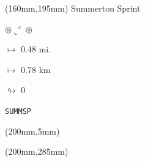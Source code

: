 \begin{textblock*}{40mm}(160mm,195mm)%
Summerton Sprint
\par $\circledcirc\llcorner^{\rightthreetimes}\circledcirc$
\Large
\par$\mapsto$ 0.48 mi.
\par$\mapsto$ 0.78 km
\par$\looparrowright$ 0
\par\hfill\tiny\tt SUMMSP\\
\end{textblock*}
\begin{textblock*}{20mm}(200mm,5mm)%
\fbox{\thepage}
\end{textblock*}
\begin{textblock*}{20mm}(200mm,285mm)%
\fbox{\thepage}
\end{textblock*}
\null\newpage


